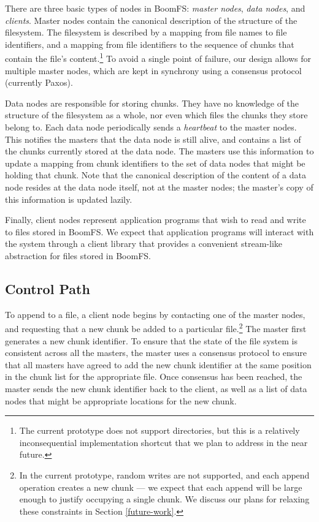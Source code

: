 \documentclass{article}
\begin{document}
There are three basic types of nodes in BoomFS: \emph{master nodes},
\emph{data nodes}, and \emph{clients}. Master nodes contain the
canonical description of the structure of the filesystem. The
filesystem is described by a mapping from file names to file
identifiers, and a mapping from file identifiers to the sequence of
chunks that contain the file's content.\footnote{The current prototype
  does not support directories, but this is a relatively
  inconsequential implementation shortcut that we plan to address in
  the near future.} To avoid a single point of failure, our design
allows for multiple master nodes, which are kept in synchrony using a
consensus protocol (currently Paxos\cite{paxos-made-simple}).

Data nodes are responsible for storing chunks. They have no knowledge
of the structure of the filesystem as a whole, nor even which files
the chunks they store belong to. Each data node periodically sends a
\emph{heartbeat} to the master nodes. This notifies the masters that
the data node is still alive, and contains a list of the chunks
currently stored at the data node. The masters use this information to
update a mapping from chunk identifiers to the set of data nodes that
might be holding that chunk. Note that the canonical description of
the content of a data node resides at the data node itself, not at the
master nodes; the master's copy of this information is updated lazily.

Finally, client nodes represent application programs that wish to read
and write to files stored in BoomFS. We expect that application
programs will interact with the system through a client library that
provides a convenient stream-like abstraction for files stored in
BoomFS. %

\subsection{Control Path}
To append to a file, a client node begins by contacting one of the
master nodes, and requesting that a new chunk be added to a particular
file.\footnote{In the current prototype, random writes are not
  supported, and each append operation creates a new chunk --- we
  expect that each append will be large enough to justify occupying a
  single chunk. We discuss our plans for relaxing these constraints in
  Section \ref{future-work}.} The master first generates a new chunk
identifier. To ensure that the state of the file system is consistent
across all the masters, the master uses a consensus protocol to ensure
that all masters have agreed to add the new chunk identifier at the
same position in the chunk list for the appropriate file. Once
consensus has been reached, the master sends the new chunk identifier
back to the client, as well as a list of data nodes that might be
appropriate locations for the new chunk.
\end{document}
